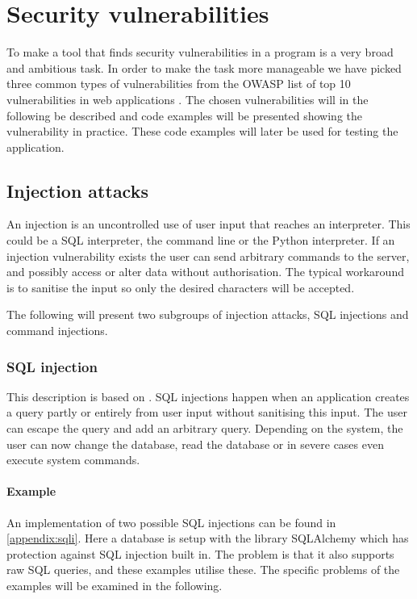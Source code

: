 \section{Security vulnerabilities}\label{security_vulnerabilities}
To make a tool that finds security vulnerabilities in a program is a very broad and ambitious task.
In order to make the task more manageable we have picked three common types of vulnerabilities from the OWASP list of top 10 vulnerabilities in web applications \cite{OWASP10}.
The chosen vulnerabilities will in the following be described and code examples will be presented showing the vulnerability in practice.
These code examples will later be used for testing the application.

\subsection{Injection attacks}\label{vulnerabilities:injection}
An injection is an uncontrolled use of user input that reaches an interpreter.
This could be a SQL interpreter, the command line or the Python interpreter.
If an injection vulnerability exists the user can send arbitrary commands to the server, and possibly access or alter data without authorisation.
The typical workaround is to sanitise the input so only the desired characters will be accepted. \citep{OWASPTOP10PDF}

The following will present two subgroups of injection attacks, SQL injections and command injections.

\subsubsection{SQL injection}
This description is based on \citet{sqlinjection}.
SQL injections happen when an application creates a query partly or entirely from user input without sanitising this input.
The user can escape the query and add an arbitrary query.
Depending on the system, the user can now change the database, read the database or in severe cases even execute system commands.

\paragraph{Example} An implementation of two possible SQL injections can be found in \cref{appendix:sqli}.
Here a database is setup with the library SQLAlchemy which has protection against SQL injection built in.
The problem is that it also supports raw SQL queries, and these examples utilise these.
The specific problems of the examples will be examined in the following.

